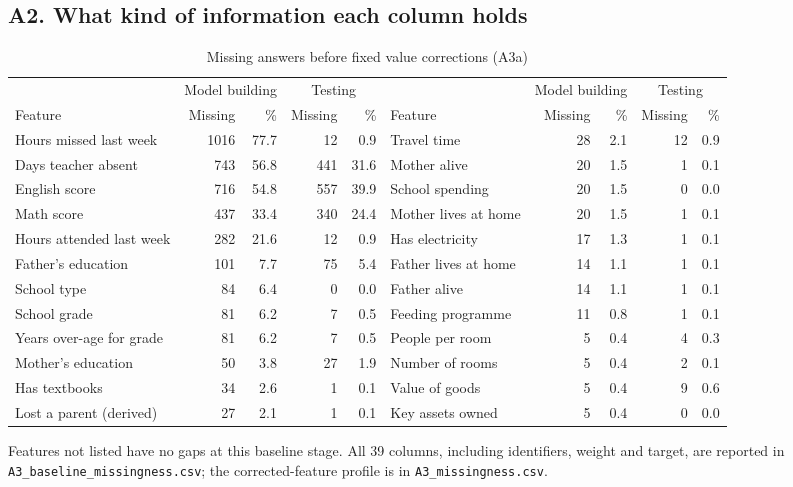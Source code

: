 \documentclass[conference,a4paper]{IEEEtran}
\newcommand{\var}[1]{\texttt{#1}}
\newcommand{\tabnote}[1]{\par\vspace{3pt}\begin{minipage}{\linewidth}\footnotesize\raggedright #1\end{minipage}}
\begin{document}
\subsection*{A2. What kind of information each column holds}
\begin{table}[!t]
\centering
\caption{Missing answers before fixed value corrections (A3a)}
\label{tab:missing}
\footnotesize
\setlength{\tabcolsep}{4pt}
\begin{tabular}{lrr|rr@{\hskip 16pt}lrr|rr}
\toprule
 & \multicolumn{2}{c|}{Model building} & \multicolumn{2}{c}{Testing} & & \multicolumn{2}{c|}{Model building} & \multicolumn{2}{c}{Testing} \\
Feature & Missing & \% & Missing & \% & Feature & Missing & \% & Missing & \% \\
\midrule
Hours missed last week & 1016 & 77.7 & 12 & 0.9 & Travel time & 28 & 2.1 & 12 & 0.9 \\
Days teacher absent & 743 & 56.8 & 441 & 31.6 & Mother alive & 20 & 1.5 & 1 & 0.1 \\
English score & 716 & 54.8 & 557 & 39.9 & School spending & 20 & 1.5 & 0 & 0.0 \\
Math score & 437 & 33.4 & 340 & 24.4 & Mother lives at home & 20 & 1.5 & 1 & 0.1 \\
Hours attended last week & 282 & 21.6 & 12 & 0.9 & Has electricity & 17 & 1.3 & 1 & 0.1 \\
Father's education & 101 & 7.7 & 75 & 5.4 & Father lives at home & 14 & 1.1 & 1 & 0.1 \\
School type & 84 & 6.4 & 0 & 0.0 & Father alive & 14 & 1.1 & 1 & 0.1 \\
School grade & 81 & 6.2 & 7 & 0.5 & Feeding programme & 11 & 0.8 & 1 & 0.1 \\
Years over-age for grade & 81 & 6.2 & 7 & 0.5 & People per room & 5 & 0.4 & 4 & 0.3 \\
Mother's education & 50 & 3.8 & 27 & 1.9 & Number of rooms & 5 & 0.4 & 2 & 0.1 \\
Has textbooks & 34 & 2.6 & 1 & 0.1 & Value of goods & 5 & 0.4 & 9 & 0.6 \\
Lost a parent (derived) & 27 & 2.1 & 1 & 0.1 & Key assets owned & 5 & 0.4 & 0 & 0.0 \\
\bottomrule
\end{tabular}
\tabnote{Features not listed have no gaps at this baseline stage. All 39 columns, including identifiers, weight and target, are reported in \var{A3\_baseline\_missingness.csv}; the corrected-feature profile is in \var{A3\_missingness.csv}.}
\end{table}
\end{document}

